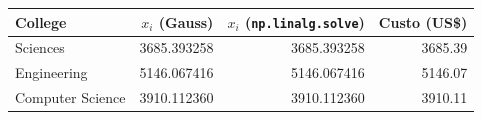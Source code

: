 \begin{tabular}{lrrr}
\toprule
College & $x_i$ (Gauss) & $x_i$ (\texttt{np.linalg.solve}) & Custo (US\$) \\
\midrule
Sciences & \num{3685.393258} & \num{3685.393258} & \num{3685.39} \\
Engineering & \num{5146.067416} & \num{5146.067416} & \num{5146.07} \\
Computer Science & \num{3910.112360} & \num{3910.112360} & \num{3910.11} \\
\bottomrule
\end{tabular}
